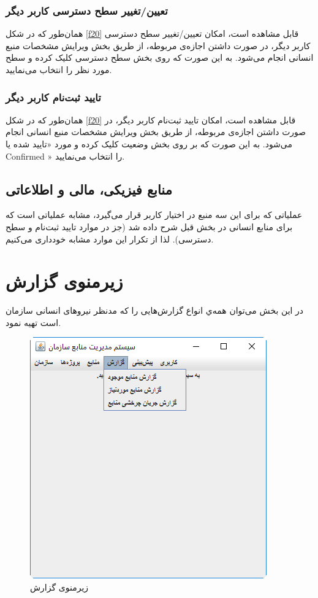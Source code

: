 \subsubsection{تعیین/تغییر سطح دسترسی کاربر دیگر}
همان‌طور که در شکل
\ref{f20}
قابل مشاهده است، امکان تعیین/تغییر سطح دسترسی کاربر دیگر، در صورت داشتن اجازه‌ی مربوطه، از طریق بخش ویرایش مشخصات منبع انسانی انجام می‌شود. به این صورت که روی بخش سطح دسترسی کلیک کرده و سطح مورد نظر را انتخاب می‌نمایید.

\subsubsection{تایید ثبت‌نام کاربر دیگر}
همان‌طور که در شکل
\ref{f20}
قابل مشاهده است، امکان تایید ثبت‌نام کاربر دیگر، در صورت داشتن اجازه‌ی مربوطه، از طریق بخش ویرایش مشخصات منبع انسانی انجام می‌شود. به این صورت که بر روی بخش وضعیت کلیک کرده و مورد «تایید شده یا Confirmed » را انتخاب می‌نمایید.


\subsection{منابع فیزیکی، مالی و اطلاعاتی}
عملیاتی که برای این سه منبع در اختیار کاربر قرار می‌گیرد، مشابه عملیاتی است که برای منابع انسانی در بخش قبل شرح داده شد (جز در موارد تایید ثبت‌نام و سطح دسترسی).   لذا از تکرار این موارد مشابه خودداری می‌کنیم.

\newpage
\section{زیرمنوی گزارش}
در این بخش می‌توان همه‌ي انواع گزارش‌هایی را که مدنظر نیروهای انسانی سازمان است تهیه نمود.
	\begin{figure}[H]
		\centering
		\includegraphics[scale=0.7]{img/manual/repSubmenu}
		\caption{زیرمنوی گزارش}
	\end{figure}
	
